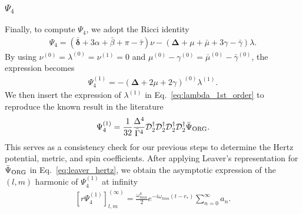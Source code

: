 \documentclass[aps,prd,amsmath,floats,floatfix, twocolumn,
superscriptaddress,nofootinbib,showpacs]{revtex4-1}
\newcommand{\hertzbar}{\bar{\Psi}_{\rm ORG}}
\begin{document}
\subsubsection{\texorpdfstring{$\Psi_4$}{Psi4}}
Finally, to compute $\Psi_4$, we adopt the Ricci identity \cite{chandrasekhar1998mathematical}
\begin{align}
    \Psi_4=(\bm{\bar{\delta}}+3\alpha+\bar{\beta}+\pi-\bar{\tau})\nu-(\bm{\Delta}+\mu+\bar{\mu}+3\gamma-\bar{\gamma})\lambda.
\end{align}
By using $\nu^{(0)}=\lambda^{(0)}=\nu^{(1)}=0$ and $\mu^{(0)}-\gamma^{(0)}=\bar{\mu}^{(0)}-\bar{\gamma}^{(0)}$,
the expression becomes
\begin{align}
    \Psi_4^{(1)}=-(\bm{\Delta}+2\mu+2\gamma)^{(0)}\lambda^{(1)}.
\end{align}
We then insert the expression of $\lambda^{(1)}$ in  Eq.~\eqref{eq:lambda_1st_order} to reproduce the known result in the literature \cite{Whiting:2005hr,Keidl:2006wk,Keidl:2010pm}
\begin{align}
    \Psi_4^{(1)}=\frac{1}{32}\frac{\Delta^4}{\bar{\Gamma}^4}\mathcal{D}_{2}^\dagger\mathcal{D}_{2}^\dagger\mathcal{D}_{2}^\dagger\mathcal{D}_2^\dagger\bar{\Psi}_{\rm ORG}. \label{eq:reconstruction_psi4}
\end{align}
This serves as a consistency check for our previous steps to determine the Hertz potential, metric, and spin coefficients.
After applying Leaver's representation for $\hertzbar$ in Eq.~\eqref{eq:leaver_hertz}, we obtain the asymptotic expression of the 
$(l,m)$ harmonic of $\Psi_4^{(1)}$ at infinity 
\begin{align}
    \left[r\Psi_4^{(1)}\right]_{l,m}^{(\infty)}=\frac{\omega_{lmn}^4}{2} e^{-i\omega_{lmn} (t-r_*)} \sum_{n=0}^\infty a_n. \label{eq:linear_psi4_inf}
\end{align}
\end{document}
